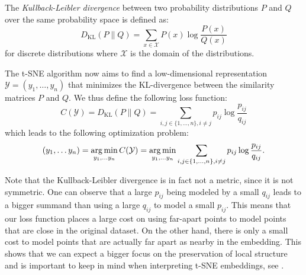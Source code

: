 \begin{defi}
    The \emph{Kullback-Leibler divergence} between two probability distributions $P$ and $Q$ over the same probability space is defined as:
    \[
    D_{\text{KL}}(P \parallel Q) = \sum_{x \in \mathcal{X}} P(x) \log\frac{P(x)}{Q(x)}
    \]
    for discrete distributions where \(\mathcal{X}\) is the domain of the distributions.
\end{defi}

The t-SNE algorithm now aims to find a low-dimensional representation $\mathcal{Y} = (y_1, \dots, y_n)$ that minimizes the KL-divergence between the similarity matrices $P$ and $Q$. 
We thus define the following loss function: 
\begin{equation}
    C(\mathcal{Y}) = D_{\text{KL}}(P \parallel Q) = \sum_{i,j \in \{1,\dots,n\}, i \neq j} p_{ij} \log \frac{p_{ij}}{q_{ij}}
\end{equation}
which leads to the following optimization problem: 
\begin{equation}
    (y_1, \dots y_n) = \operatorname*{arg\,min}_{y_1, \dots y_n} C(\mathcal{Y}) = \operatorname*{arg\,min}_{y_1, \dots y_n} \sum_{i,j \in \{1,\dots,n\}, i \neq j} p_{ij} \log \frac{p_{ij}}{q_{ij}}.
\end{equation}


Note that the Kullback-Leibler divergence is in fact not a metric, since it is not symmetric. 
One can observe that a large $p_{ij}$ being modeled by a small $q_{ij}$ leads to a bigger summand than using a large $q_{ij}$ to model a small $p_{ij}$. 
This means that our loss function places a large cost on using far-apart points to model points that are close in the original dataset. 
On the other hand, there is only a small cost to model points that are actually far apart as nearby in the embedding. 
This shows that we can expect a bigger focus on the preservation of local structure and is important to keep in mind when interpreting t-SNE embeddings, see \cite{Wa16Distill}. 

